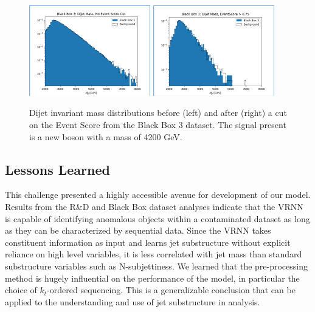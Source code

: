 \documentclass[letterpaper,11pt]{article}
\begin{document}
\begin{figure}[h!]
	\begin{center}
		\includegraphics[width=0.47\textwidth]{imgs/BB3.png}
		\includegraphics[width=0.47\textwidth]{imgs/BB3_Cut.png}
	\end{center}
	\caption{Dijet invariant mass distributions before (left) and after (right) a cut on the Event Score from the Black Box 3 dataset. The signal present is a new boson with a mass of 4200 GeV.}
	\label{fig:bb3}
\end{figure}


\subsection{Lessons Learned}
\label{sec:lessons}


This challenge presented a highly accessible avenue for development of our model. 
Results from the R\&D and Black Box dataset analyses indicate that the VRNN is capable of identifying anomalous objects within a contaminated dataset as long as they can be characterized by sequential data. 
Since the VRNN takes constituent information as input and learns jet substructure without explicit reliance on high level variables, it is less correlated with jet mass than standard substructure variables such as N-subjettiness. 
We learned that the pre-processing method is hugely influential on the performance of the model, in particular the choice of $k_{t}$-ordered sequencing. 
This is a generalizable conclusion that can be applied to the understanding and use of jet substructure in analysis.
\end{document}
